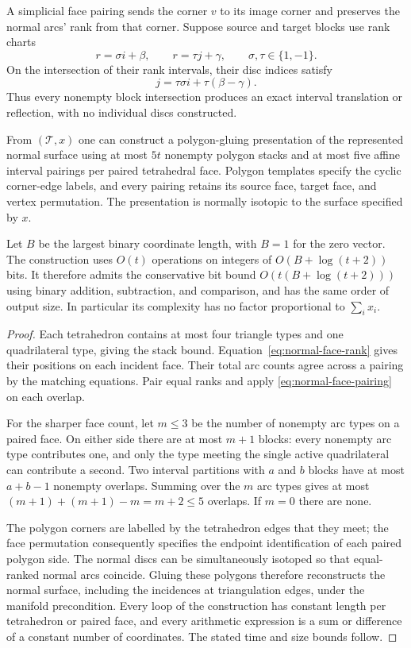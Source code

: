 A simplicial face pairing sends the corner $v$ to its image corner and
preserves the normal arcs' rank from that corner. Suppose source and target
blocks use rank charts
\[
 r=\sigma i+\beta,\qquad r=\tau j+\gamma,
 \qquad \sigma,\tau\in\{1,-1\}.
\]
On the intersection of their rank intervals, their disc indices satisfy
\begin{equation}
 j=\tau\sigma i+\tau(\beta-\gamma).
 \label{eq:normal-face-pairing}
\end{equation}
Thus every nonempty block intersection produces an exact interval
translation or reflection, with no individual discs constructed.

\begin{theorem}
\label{thm:normal-five-bands}
From $(\mathcal T,x)$ one can construct a polygon-gluing presentation of the
represented normal surface using at most $5t$ nonempty polygon stacks and
at most five affine interval pairings per paired tetrahedral face. Polygon
templates specify the cyclic corner-edge labels, and every pairing retains
its source face, target face, and vertex permutation. The presentation is
normally isotopic to the surface specified by $x$.

Let $B$ be the largest binary coordinate length, with $B=1$ for the zero
vector. The construction uses $O(t)$ operations on integers of
$O(B+\log(t+2))$ bits. It therefore admits the conservative bit bound
$O(t(B+\log(t+2)))$ using binary addition, subtraction, and comparison,
and has the same order of output size. In particular its complexity has
no factor proportional to $\sum_i x_i$.
\end{theorem}

\begin{proof}
Each tetrahedron contains at most four triangle types and one quadrilateral
type, giving the stack bound. Equation~\eqref{eq:normal-face-rank} gives
their positions on each incident face. Their total arc counts agree across
a pairing by the matching equations. Pair equal ranks and apply
\eqref{eq:normal-face-pairing} on each overlap.

For the sharper face count, let $m\le3$ be the number of nonempty arc types
on a paired face. On either side there are at most $m+1$ blocks: every
nonempty arc type contributes one, and only the type meeting the single
active quadrilateral can contribute a second. Two interval partitions with
$a$ and $b$ blocks have at most $a+b-1$ nonempty overlaps. Summing over
the $m$ arc types gives at most $(m+1)+(m+1)-m=m+2\le5$ overlaps. If $m=0$
there are none.

The polygon corners are labelled by the tetrahedron edges that they meet;
the face permutation consequently specifies the endpoint identification of
each paired polygon side. The normal discs can be simultaneously isotoped
so that equal-ranked normal arcs coincide. Gluing these polygons therefore
reconstructs the normal surface, including the incidences at triangulation
edges, under the manifold precondition. Every loop of the construction has
constant length per tetrahedron or paired face, and every arithmetic
expression is a sum or difference of a constant number of coordinates.
The stated time and size bounds follow.
\end{proof}

